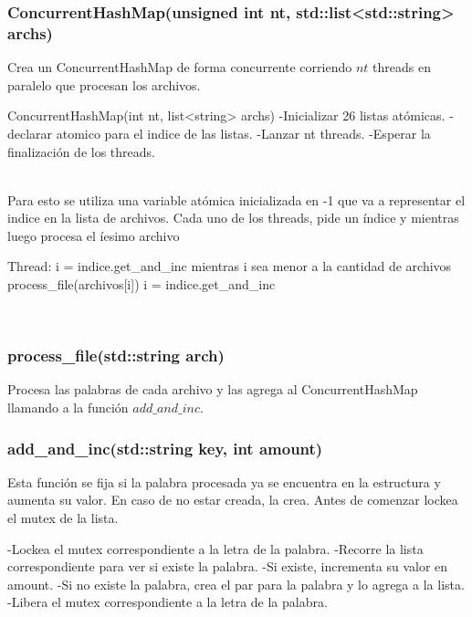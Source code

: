 \subsubsection{ConcurrentHashMap(unsigned int nt, std::list<std::string> archs)}
Crea un ConcurrentHashMap de forma concurrente corriendo $nt$ threads en paralelo que procesan los archivos.\\
\begin{codesnippet}
 ConcurrentHashMap(int nt, list<string> archs)
 	-Inicializar 26 listas atómicas.
 	-declarar atomico para el indice de las listas.
 	-Lanzar nt threads.
 	-Esperar la finalización de los threads.
\end{codesnippet}\\
Para esto se utiliza una variable atómica inicializada en -1 que va a representar el indice en la lista de archivos.
Cada uno de los threads, pide un índice y mientras luego procesa el íesimo archivo\\
\begin{codesnippet}
 	Thread:
 		i = indice.get_and_inc
 		mientras i sea menor a la cantidad de archivos
 			process_file(archivos[i])
 			i = indice.get_and_inc
\end{codesnippet}\\

\subsubsection{process_file(std::string arch)}
Procesa las palabras de cada archivo y las agrega al ConcurrentHashMap llamando a la función $add\_and\_inc$.

\subsubsection{add_and_inc(std::string key, int amount)}
Esta función se fija si la palabra procesada ya se encuentra en la estructura y aumenta su valor. En caso de no estar creada, la crea. Antes de comenzar lockea el mutex de la lista.\\
\begin{codesnippet}
 	-Lockea el mutex correspondiente a la letra de la palabra.
 	-Recorre la lista correspondiente para ver si existe la palabra.
 	-Si existe, incrementa su valor en amount.
 	-Si no existe la palabra, crea el par para la palabra y lo agrega a la lista.
 	-Libera el mutex correspondiente a la letra de la palabra.
\end{codesnippet}\\

